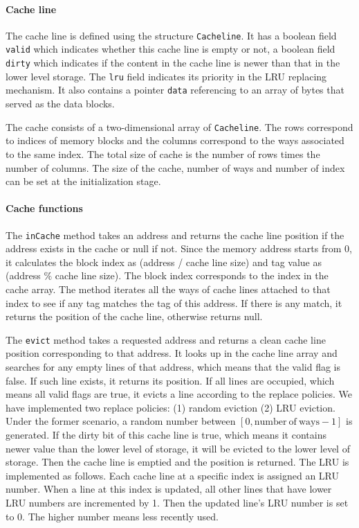 \documentclass{sig-alternate}
\begin{document}
\paragraph{Cache line}
 The cache line is defined using the structure \texttt{Cacheline}. It has a boolean field \texttt{valid} which indicates whether this cache line is empty or not, a boolean field \texttt{dirty} which indicates if the content in the cache line is newer than that in the lower level storage. The \texttt{lru} field indicates its priority in the LRU replacing mechanism. It also contains a pointer \texttt{data} referencing to an array of bytes that served as the data blocks.

The cache consists of a two-dimensional array of \texttt{Cacheline}. The rows correspond to indices of memory blocks and the columns correspond to the ways associated to the same index. The total size of cache is the number of rows times the number of columns. The size of the cache, number of ways and number of index can be set at the initialization stage.

\paragraph{Cache functions}
The \texttt{inCache} method takes an address and returns the cache line position if the address exists in the cache or null if not. Since the memory address starts from 0, it calculates the block index as (address / cache line size) and tag value as (address $\%$ cache line size). The block index corresponds to the index in the cache array. The method iterates all the ways of cache lines attached to that index to see if any tag matches the tag of this address. If there is any match, it returns the position of the cache line, otherwise returns null. 

The \texttt{evict} method takes a requested address and returns a clean cache line position corresponding to that address. It looks up in the cache line array and searches for any empty lines of that address, which means that the valid flag is false. If such line exists, it returns its position. If all lines are occupied, which means all valid flags are true, it evicts a line according to the replace policies. We have implemented two replace policies: (1) random eviction (2) LRU eviction. Under the former scenario, a random number between $[0, \mathrm{number\ of\ ways} - 1]$ is generated. If the dirty bit of this cache line is true, which means it contains newer value than the lower level of storage, it will be evicted to the lower level of storage. Then the cache line is emptied and the position is returned. The LRU is implemented as follows. Each cache line at a specific index is assigned an LRU number. When a line at this index is updated, all other lines that have lower LRU numbers are incremented by 1. Then the updated line's LRU number is set to 0. The higher number means less recently used. 
\end{document}
